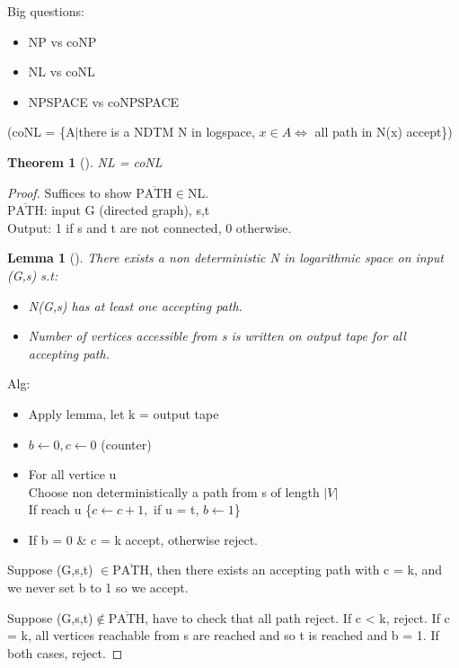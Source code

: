 \documentclass{article}
\newtheorem{theorem}{Theorem}
\newtheorem{lemma}{Lemma}
\theoremstyle{definition}
\theoremstyle{remark}
\newcommand{\Thm}[3]{\begin{theorem}[#1]\label{#2}#3\end{theorem}}
\newcommand{\Lem}[3]{\begin{lemma}[#1]\label{#2}#3\end{lemma}}
\newcommand{\Proof}[1]{\begin{proof}#1\end{proof}}
\begin{document}
Big questions: \begin{itemize}
	\item NP vs coNP
	\item NL vs coNL
	\item NPSPACE vs coNPSPACE
\end{itemize}
(coNL = \{A$|$there is a NDTM N in logspace, $x\in A \Leftrightarrow$ all path in N(x) accept\})\\

\Thm{}{}{NL = coNL}
\Proof{Suffices to show $\overline{\text{PATH}}\in$NL.\\
	
$\overline{\text{PATH}}$: input G (directed graph), s,t\\
Output: 1 if s and t are not connected, 0 otherwise.\\

\Lem{}{}{There exists a non deterministic N in logarithmic space on input (G,s) s.t:\begin{itemize}
		\item N(G,s) has at least one accepting path.
		\item Number of vertices accessible from s is written on output tape for all accepting path.
	\end{itemize}}
Alg:\begin{itemize}
	\item Apply lemma, let k = output tape
	\item $b \leftarrow 0, c \leftarrow 0$ (counter)
	\item For all vertice u\\
	\indent Choose non deterministically a path from s of length $|V|$\\
	\indent If reach u \{$c \leftarrow c+1,$ if u = t, $b \leftarrow 1$\}
	\item If b = 0 \& c = k accept, otherwise reject.
\end{itemize}

Suppose (G,s,t) $\in \overline{\text{PATH}}$, then there exists an accepting path with c = k, and we never set b to 1 so we accept.

Suppose (G,s,t)$\notin \overline{\text{PATH}}$, have to check that all path reject. If c < k, reject. If c = k, all vertices reachable from s are reached and so t is reached and b = 1. If both cases, reject.
}
\end{document}

